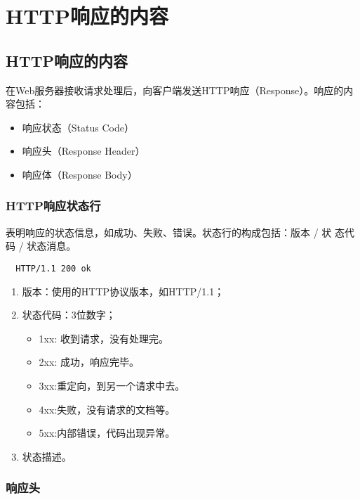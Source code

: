 \section{HTTP响应的内容}

\subsection{HTTP响应的内容}

在Web服务器接收请求处理后，向客户端发送HTTP响应（Response）。响应的内容包括：

\begin{itemize}
\item 响应状态（Status Code）
\item 响应头（Response Header）
\item 响应体（Response Body）
\end{itemize}

\subsubsection{HTTP响应状态行} 

表明响应的状态信息，如成功、失败、错误。状态行的构成包括：{\kai\Red 版本 / 状
  态代码 / 状态消息}。


\begin{verbatim}
  HTTP/1.1 200 ok
\end{verbatim}

\begin{enumerate}
\item 版本：使用的HTTP协议版本，如HTTP/1.1；
\item 状态代码：3位数字；
  \begin{itemize}
  \item 1xx: 收到请求，没有处理完。
  \item 2xx: 成功，响应完毕。
  \item 3xx:重定向，到另一个请求中去。
  \item 4xx:失败，没有请求的文档等。
  \item 5xx:内部错误，代码出现异常。
  \end{itemize}
\item 状态描述。
\end{enumerate}

\subsubsection{响应头} 

